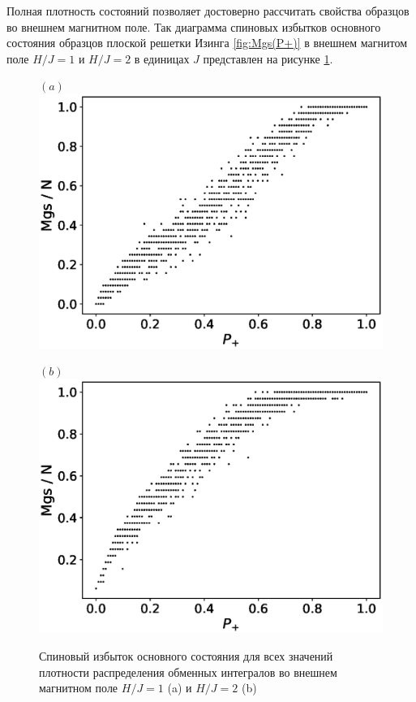 \documentclass[utf8, babel, sor, jor, amsmath, amssymb, reprint]{elsarticle} %
\begin{document}
Полная плотность состояний позволяет достоверно рассчитать свойства образцов во внешнем магнитном поле. Так диаграмма спиновых избытков основного состояния образцов плоской решетки Изинга \ref{fig:Mgs(P+)} в внешнем магнитом поле $H/J = 1$ и $H/J = 2$ в единицах $J$ представлен на рисунке \ref{fig:Mgs(P+)_H}.

\begin{figure}[H]
	\begin{minipage}[h]{0.45\linewidth}
		\centering $(a)$
		\includegraphics[width=1\linewidth]{images/Mgs(P+)_H1.eps}
	\end{minipage}
	\hfill
	\begin{minipage}[h]{0.45\linewidth}
		\centering $(b)$
		\includegraphics[width=1\linewidth]{images/Mgs(P+)_H2.eps}
	\end{minipage}
	\caption{Спиновый избыток основного состояния для всех значений плотности распределения обменных интегралов во внешнем магнитном поле $H/J = 1$ (a) и $H/J = 2$ (b)}
	\label{fig:Mgs(P+)_H}
\end{figure}
\end{document}

